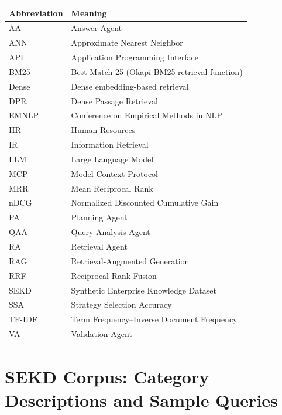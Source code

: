 \documentclass[12pt, a4paper, twoside]{report}
\begin{document}
\begin{tabular}{ll}
\toprule
\textbf{Abbreviation} & \textbf{Meaning} \\
\midrule
AA      & Answer Agent \\
ANN     & Approximate Nearest Neighbor \\
API     & Application Programming Interface \\
BM25    & Best Match 25 (Okapi BM25 retrieval function) \\
Dense   & Dense embedding-based retrieval \\
DPR     & Dense Passage Retrieval \\
EMNLP  & Conference on Empirical Methods in NLP \\
HR      & Human Resources \\
IR      & Information Retrieval \\
LLM     & Large Language Model \\
MCP     & Model Context Protocol \\
MRR     & Mean Reciprocal Rank \\
nDCG    & Normalized Discounted Cumulative Gain \\
PA      & Planning Agent \\
QAA     & Query Analysis Agent \\
RA      & Retrieval Agent \\
RAG     & Retrieval-Augmented Generation \\
RRF     & Reciprocal Rank Fusion \\
SEKD    & Synthetic Enterprise Knowledge Dataset \\
SSA     & Strategy Selection Accuracy \\
TF-IDF  & Term Frequency–Inverse Document Frequency \\
VA      & Validation Agent \\
\bottomrule
\end{tabular}











\appendix

\chapter{SEKD Corpus: Category Descriptions and Sample Queries}
\label{app:sekd}
\end{document}
